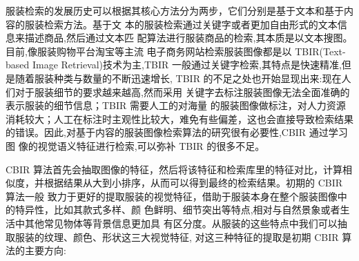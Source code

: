 服装检索的发展历史可以根据其核心方法分为两步，它们分别是基于文本和基于内容的服装检索方法。基于文
本的服装检索通过关键字或者更加自由形式的文本信息来描述商品,然后通过文本匹
配算法进行服装商品的检索,其本质是以文本搜图。目前,像服装购物平台淘宝等主流
电子商务网站检索服装图像都是以 TBIR(Text-based Image Retrieval)技术为主,TBIR
一般通过关键字检索,其特点是快速精准,但是随着服装种类与数量的不断迅速增长,
TBIR 的不足之处也开始显现出来:现在人们对于服装细节的要求越来越高,然而采用
关键字去标注服装图像无法全面准确的表示服装的细节信息；TBIR 需要人工的对海量
的服装图像做标注，对人力资源消耗较大；人工在标注时主观性比较大，难免有些偏差，这也会直接导致检索结果
的错误。因此,对基于内容的服装图像检索算法的研究很有必要性,CBIR 通过学习图
像的视觉语义特征进行检索,可以弥补 TBIR 的很多不足。

CBIR 算法首先会抽取图像的特征，然后将该特征和检索库里的特征对比，计算相
似度，并根据结果从大到小排序，从而可以得到最终的检索结果。初期的 CBIR 算法一般
致力于更好的提取服装的视觉特征，借助于服装本身在整个服装图像中的特异性，比如其款式多样、颜
色鲜明、细节突出等特点,相对与自然景象或者生活中其他常见物体等背景信息更加具
有区分度。从服装的这些特点中我们可以抽取服装的纹理、颜色、形状这三大视觉特征,
对这三种特征的提取是初期 CBIR 算法的主要方向:
